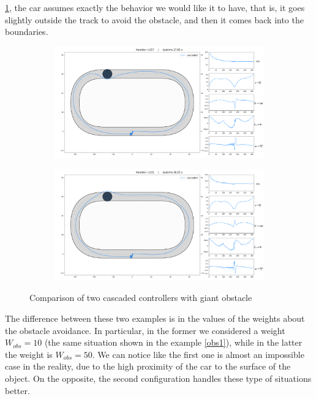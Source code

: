 \documentclass[a4paper, onecolumn, 12pt]{article}
\begin{document}
\ref{giant2}, the car assumes exactly the behavior we would like it to have, that is, 
it goes slightly outside the track to avoid the obstacle, and then it comes back into 
the boundaries. 
\begin{figure}[H]
    \centering
    \begin{subfigure}{0.9\textwidth}
        \centering
        \includegraphics[width=\textwidth]{assets/giant2.png}
        \label{giant2}
    \end{subfigure}
    \begin{subfigure}{0.9\textwidth}
        \centering
        \includegraphics[width=\textwidth]{assets/giant1.png}
        \label{giant1}
    \end{subfigure}
    \caption[short]{Comparison of two cascaded controllers with giant obstacle}
\end{figure}
The difference between these two examples is in the values of the weights 
about the obstacle avoidance. In particular, in the former we considered a weight $W_{obs}=10$ 
(the same situation shown in the example \ref{obs1}), while in the latter the weight is
$W_{obs}=50$. We can notice like the first one is almost an impossible case in the reality,
due to the high proximity of the car to the surface of the object. On the opposite, the
second configuration handles these type of situations better.
\end{document}
